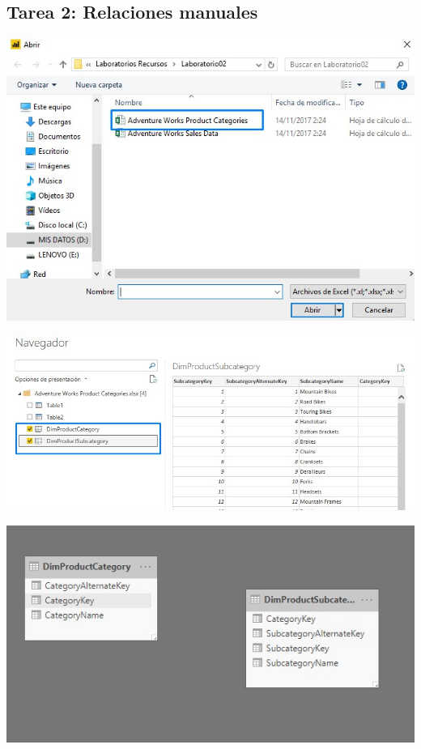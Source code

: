 \subsection{Tarea 2: Relaciones manuales}

\begin{center}
\includegraphics[width=\columnwidth]{images/task2/task2-01}\newline
\end{center}

\begin{center}
\includegraphics[width=\columnwidth]{images/task2/task2-02}\newline
\end{center}

\begin{center}
\includegraphics[width=\columnwidth]{images/task2/task2-04}\newline
\end{center}

